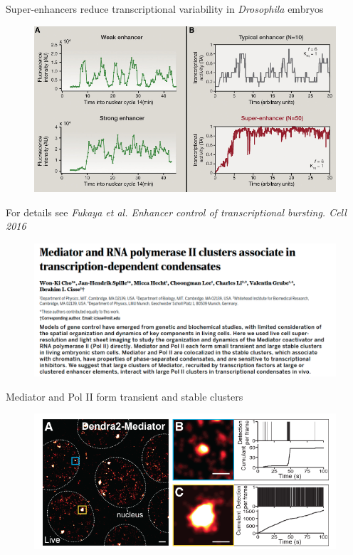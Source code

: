 \documentclass[aspectratio=1610]{beamer}					%
\begin{document}
\begin{frame}{Super-enhancers reduce transcriptional variability in \emph{Drosophila} embryos}
\begin{figure}
\includegraphics[width=12cm]{figure-5-7.png}
\end{figure}
For details see \textit{Fukaya et al. Enhancer control of transcriptional bursting. Cell 2016}
\end{frame}


\begin{frame}{}
\begin{figure}
\includegraphics[width=14cm]{abstract-1.png}
\end{figure}
\end{frame}


\begin{frame}{Mediator and Pol II form transient and stable clusters}
\begin{figure}
\includegraphics[width=14cm]{figure-1-1.png}
\end{figure}
\end{frame}
\end{document}
